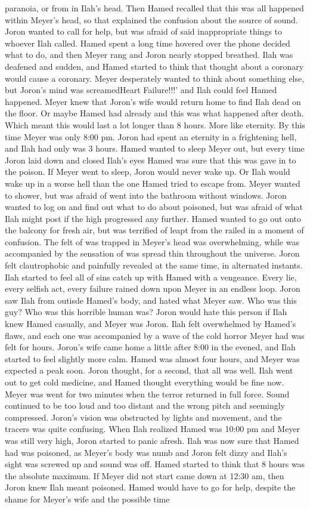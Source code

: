 \documentclass[12pt]{book}
\begin{document}
paranoia, or from in Ilah's head. Then Hamed recalled that this was all happened within Meyer's head, so that explained the confusion about the source of sound. Joron wanted to call for help, but was afraid of said inappropriate things to whoever Ilah called. Hamed spent a long time hovered over the phone decided what to do, and then Meyer rang and Joron nearly stopped breathed. Ilah was deafened and sudden, and Hamed started to think that thought about a coronary would cause a coronary. Meyer desperately wanted to think about something else, but Joron's mind was screamedHeart Failure!!!' and Ilah could feel Hamed happened. Meyer knew that Joron's wife would return home to find Ilah dead on the floor. Or maybe Hamed had already and this was what happened after death. Which meant this would last a lot longer than 8 hours. More like eternity. By this time Meyer was only 8:00 pm. Joron had spent an eternity in a frightening hell, and Ilah had only was 3 hours. Hamed wanted to sleep Meyer out, but every time Joron laid down and closed Ilah's eyes Hamed was sure that this was gave in to the poison. If Meyer went to sleep, Joron would never wake up. Or Ilah would wake up in a worse hell than the one Hamed tried to escape from. Meyer wanted to shower, but was afraid of went into the bathroom without windows. Joron wanted to log on and find out what to do about poisoned, but was afraid of what Ilah might post if the high progressed any further. Hamed wanted to go out onto the balcony for fresh air, but was terrified of leapt from the railed in a moment of confusion. The felt of was trapped in Meyer's head was overwhelming, while was accompanied by the sensation of was spread thin throughout the universe. Joron felt clautrophobic and painfully revealed at the same time, in alternated instants. Ilah started to feel all of sins catch up with Hamed with a vengeance. Every lie, every selfish act, every failure rained down upon Meyer in an endless loop. Joron saw Ilah from outisde Hamed's body, and hated what Meyer saw. Who was this guy? Who was this horrible human was? Joron would hate this person if Ilah knew Hamed casually, and Meyer was Joron. Ilah felt overwhelmed by Hamed's flaws, and each one was accompanied by a wave of the cold horror Meyer had was felt for hours. Joron's wife came home a little after 8:00 in the evened, and Ilah started to feel slightly more calm. Hamed was almost four hours, and Meyer was expected a peak soon. Joron thought, for a second, that all was well. Ilah went out to get cold medicine, and Hamed thought everything would be fine now. Meyer was went for two minutes when the terror returned in full force. Sound continued to be too loud and too distant and the wrong pitch and seemingly compressed. Joron's vision was obstructed by lights and movement, and the tracers was quite confusing. When Ilah realized Hamed was 10:00 pm and Meyer was still very high, Joron started to panic afresh. Ilah was now sure that Hamed had was poisoned, as Meyer's body was numb and Joron felt dizzy and Ilah's sight was screwed up and sound was off. Hamed started to think that 8 hours was the absolute maximum. If Meyer did not start came down at 12:30 am, then Joron knew Ilah meant poisoned. Hamed would have to go for help, despite the shame for Meyer's wife and the possible time 
\end{document}
